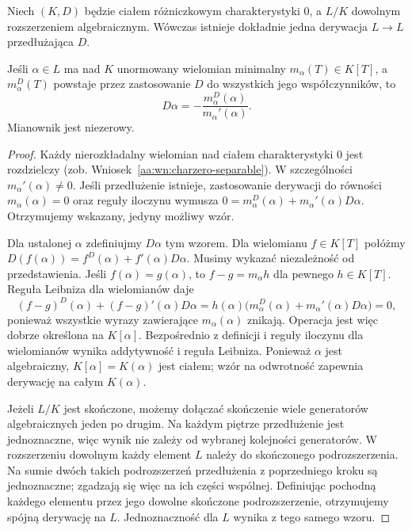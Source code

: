 \begin{twierdzenie}
\label{aa:tw:algebraic-derivation-extension}
Niech $(K,D)$ będzie ciałem różniczkowym
charakterystyki $0$, a $L/K$ dowolnym rozszerzeniem
algebraicznym. Wówczas istnieje dokładnie jedna
derywacja $L\to L$ przedłużająca $D$.

Jeśli $\alpha\in L$ ma nad $K$ unormowany wielomian
minimalny $m_\alpha(T)\in K[T]$, a
$m_\alpha^D(T)$ powstaje przez zastosowanie $D$
do wszystkich jego współczynników, to
\[
D\alpha=-\frac{m_\alpha^D(\alpha)}{m_\alpha'(\alpha)}.
\]
Mianownik jest niezerowy.
\end{twierdzenie}
\begin{proof}
Każdy nierozkładalny wielomian nad ciałem charakterystyki
$0$ jest rozdzielczy (zob.
Wniosek~\ref{aa:wn:charzero-separable}). W szczególności
$m_\alpha'(\alpha)\ne0$.
Jeśli przedłużenie istnieje, zastosowanie derywacji
do równości $m_\alpha(\alpha)=0$ oraz reguły iloczynu
wymusza
$0=m_\alpha^D(\alpha)+m_\alpha'(\alpha)D\alpha$.
Otrzymujemy wskazany, jedyny możliwy wzór.

Dla ustalonej $\alpha$ zdefiniujmy $D\alpha$ tym wzorem.
Dla wielomianu $f\in K[T]$ połóżmy
$D(f(\alpha))=f^D(\alpha)+f'(\alpha)D\alpha$.
Musimy wykazać niezależność od przedstawienia.
Jeśli $f(\alpha)=g(\alpha)$, to
$f-g=m_\alpha h$ dla pewnego $h\in K[T]$.
Reguła Leibniza dla wielomianów daje
\[
(f-g)^D(\alpha)+(f-g)'(\alpha)D\alpha
=h(\alpha)\bigl(m_\alpha^D(\alpha)
                +m_\alpha'(\alpha)D\alpha\bigr)=0,
\]
ponieważ wszystkie wyrazy zawierające
$m_\alpha(\alpha)$ znikają. Operacja jest więc
dobrze określona na $K[\alpha]$.
Bezpośrednio z definicji i reguły iloczynu
dla wielomianów wynika addytywność i reguła
Leibniza. Ponieważ $\alpha$ jest algebraiczny,
$K[\alpha]=K(\alpha)$ jest ciałem; wzór na
odwrotność zapewnia derywację na całym $K(\alpha)$.

Jeżeli $L/K$ jest skończone, możemy dołączać
skończenie wiele generatorów algebraicznych
jeden po drugim. Na każdym piętrze przedłużenie
jest jednoznaczne, więc wynik nie zależy
od wybranej kolejności generatorów.
W rozszerzeniu dowolnym każdy element $L$
należy do skończonego podrozszerzenia.
Na sumie dwóch takich podrozszerzeń
przedłużenia z poprzedniego kroku są jednoznaczne;
zgadzają się więc na ich części wspólnej.
Definiując pochodną każdego elementu przez
jego dowolne skończone podrozszerzenie,
otrzymujemy spójną derywację na $L$.
Jednoznaczność dla $L$ wynika z tego samego wzoru.
\end{proof}

